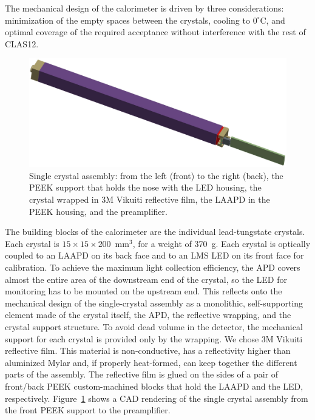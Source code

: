 The mechanical design of the calorimeter is driven by three considerations: minimization of the empty spaces between
the crystals, cooling to $0^\circ$C, and optimal coverage of the required acceptance without interference with the rest
of CLAS12.

\begin{figure}[th!]
\centering 
\includegraphics[width=1.0\columnwidth]{./fig/sc-assembly.eps}
\caption{Single crystal assembly: from the left (front) to the right (back), the PEEK support that holds the nose with
  the LED housing, the crystal wrapped in 3M Vikuiti reflective film, the LAAPD in the PEEK housing, and the
  preamplifier.}
\label{fig:crystalassembly} 
\end{figure}

The building blocks of the calorimeter are the individual lead-tungstate crystals. Each crystal is
$15\times 15\times200$~mm$^3$, for a weight of 370~g. Each crystal is optically coupled to an LAAPD on its
back face and to an LMS LED on its front face for calibration. To achieve the maximum light collection efficiency,
the APD covers almost the entire area of the downstream end of the crystal, so the LED for monitoring has to be
mounted on the upstream end. This reflects onto the mechanical design of the single-crystal assembly as a monolithic,
self-supporting element made of the crystal itself, the APD, the reflective wrapping, and the crystal support
structure. To avoid dead volume in the detector, the mechanical support for each crystal is provided only by the
wrapping. We chose 3M Vikuiti reflective film. This material is non-conductive, has a reflectivity higher than
aluminized Mylar and, if properly heat-formed, can keep together the different parts of the assembly. The
reflective film is glued on the sides of a pair of front/back PEEK custom-machined blocks that hold the LAAPD and
the LED, respectively. Figure~\ref{fig:crystalassembly} shows a CAD rendering of the single crystal assembly from
the front PEEK support to the preamplifier.

